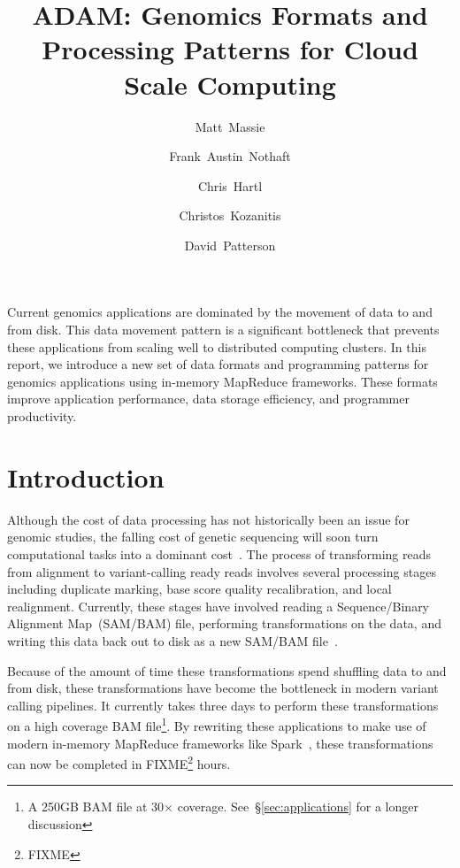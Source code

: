 \documentclass[10pt,twocolumn]{article}
\date{}
\theoremstyle{plain}
\begin{document}
\title{ADAM: Genomics Formats and Processing Patterns for Cloud Scale Computing}
\author[1]{Matt~Massie}
\author[1]{Frank~Austin~Nothaft}
\author[1,2]{Chris~Hartl}
\author[1]{Christos~Kozanitis}
\author[1]{David~Patterson}

\maketitle

\raggedbottom

\abstract

Current genomics applications are dominated by the movement of data to and from disk. This data movement pattern
is a significant bottleneck that prevents these applications from scaling well to distributed computing clusters. In this report,
we introduce a new set of data formats and programming patterns for genomics applications using in-memory MapReduce
frameworks. These formats improve application performance, data storage efficiency, and programmer productivity.

\section{Introduction}
\label{sec:introduction}

Although the cost of data processing has not historically been an issue for genomic studies, the falling cost of genetic
sequencing will soon turn computational tasks into a dominant cost~\cite{nhgri}. The process of transforming reads
from alignment to variant-calling ready reads involves several processing stages including duplicate marking, base
score quality recalibration, and local realignment. Currently, these stages have involved reading a Sequence/Binary
Alignment Map~(SAM/BAM) file, performing transformations on the data, and writing this data back out to disk as a
new SAM/BAM file~\cite{li09}.

Because of the amount of time these transformations spend shuffling data to and from disk, these transformations have become
the bottleneck in modern variant calling pipelines. It currently takes three days to perform these transformations on a high
coverage BAM file\footnote{A 250GB BAM file at 30$\times$ coverage. See~\S\ref{sec:applications} for a longer discussion}. By
rewriting these applications to make use of modern in-memory MapReduce frameworks like Spark~\cite{zaharia10}, these
transformations can now be completed in FIXME\footnote{FIXME} hours.
\end{document}
